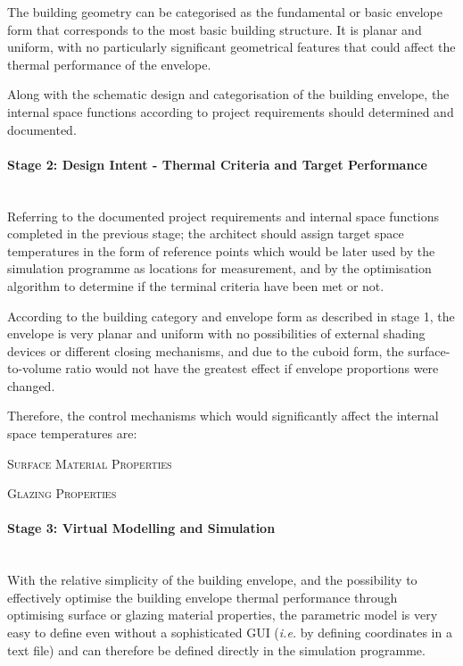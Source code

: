 The building geometry can be categorised as the fundamental or basic envelope form that corresponds to the most basic building structure. It is planar and uniform, with no particularly significant geometrical features that could affect the thermal performance of the envelope.

Along with the schematic design and categorisation of the building envelope, the internal space functions according to project requirements should determined and documented.

\paragraph{Stage 2: Design Intent - Thermal Criteria and Target Performance}\mbox{}\\

Referring to the documented project requirements and internal space functions completed in the previous stage; the architect should assign target space temperatures in the form of reference points which would be later used by the simulation programme as locations for measurement, and by the optimisation algorithm to determine if the terminal criteria have been met or not.

According to the building category and envelope form as described in stage 1, the envelope is very planar and uniform with no possibilities of external shading devices or different closing mechanisms, and due to the cuboid form, the surface-to-volume ratio would not have the greatest effect if envelope proportions were changed.

Therefore, the control mechanisms which would significantly affect the internal space temperatures are:
\begin{compactenum}
	\item \textsc{Surface Material Properties}
	\item \textsc{Glazing Properties}
\end{compactenum}

\paragraph{Stage 3: Virtual Modelling and Simulation}\mbox{}\\

With the relative simplicity of the building envelope, and the possibility to effectively optimise the building envelope thermal performance through optimising surface or glazing material properties, the parametric model is very easy to define even without a sophisticated GUI (\emph{i.e.} by defining coordinates in a text file) and can therefore be defined directly in the simulation programme.

